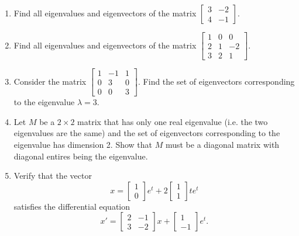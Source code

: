 \documentclass[11pt]{article}
\theoremstyle{definition}
\begin{document}
\begin{enumerate}[leftmargin=*]
(c) Find all constant solutions $x(t)=
\left[
\begin{array}{c}
x_1(t)\\
x_2(t)\\
x_3(t)
\end{array}\right]$ (i.e. $x_1, x_2, x_3$ are actually constant functions) to the following system of differential equations
\[
x'=
\left[
\begin{array}{ccc}
2&0 & -1\\
1&1 &2\\
0 & 0& 0
\end{array}\right]x.
\]
Note that the columns of this matrix is the same as the three vectors in part (b).  \emph{Hint: what is $x'(t)$ when $x(t)$ is constant? }

\item Find all eigenvalues and eigenvectors of the matrix
$ 
\left[
\begin{array}{cc}
3&-2\\
4&-1
\end{array}\right].
$
\item Find all eigenvalues and eigenvectors of the matrix
$ 
\left[
\begin{array}{ccc}
1&0&0\\
2&1&-2\\
3&2&1
\end{array}\right].
$\\


\item Consider the matrix $\left[
\begin{array}{ccc}
1&-1&1\\
0&3&0\\
0&0&3
\end{array}\right].$
Find the set of eigenvectors corresponding to the eigenvalue $\lambda=3$.

\item Let $M$ be a $2\times 2$ matrix that has only one real eigenvalue (i.e. the two eigenvalues are the same) and the set of eigenvectors corresponding to the eigenvalue has dimension 2.  Show that $M$ must be a diagonal matrix with diagonal entires being the eigenvalue. 

\item Verify that the vector 
\[
x=\left[
\begin{array}{c}
1\\
0
\end{array}\right] e^t+ 2\left[
\begin{array}{c}
1\\
1
\end{array}\right] te^t
\]
satisfies the differential equation
\[x'=\left[
\begin{array}{cc}
2&-1\\
3&-2
\end{array}\right] x+ \left[
\begin{array}{c}
1\\
-1
\end{array}\right]e^t.
 \]
 

\end{enumerate}
\end{document}

